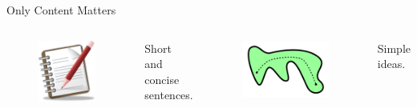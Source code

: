 \documentclass[xetex, aspectratio=169]{beamer}
\begin{document}
\begin{frame}[fragile]{Only Content Matters}
	\begin{columns}
		{
			\begin{figure}
				\includegraphics[scale=0.08]{img/short}
			\end{figure}
		\begin{center}
		Short and concise sentences.
		\end{center}

		}
		
	{
		\begin{figure}
			\includegraphics[scale=0.07]{img/simple}
		\end{figure}
	\begin{center}
		Simple ideas.
	\end{center}

}
\end{columns}
\end{frame}
\end{document}

